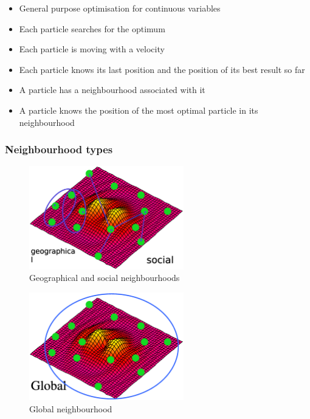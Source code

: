 \documentclass[a4paper]{article}
\begin{document}
\begin{itemize}
  \item General purpose optimisation for continuous variables
  \item Each particle searches for the optimum
  \item Each particle is moving with a velocity
  \item Each particle knows its last position and the position of its best
        result so far
  \item A particle has a neighbourhood associated with it
  \item A particle knows the position of the most optimal particle in its
        neighbourhood
\end{itemize}

\subsubsection{Neighbourhood types}

\begin{figure}[h!]
  \centering
  \includegraphics[width=0.6\textwidth]{graphics/pso_neighbourhoods_1.eps}
  \caption{Geographical and social neighbourhoods}
  \label{fig:pso_neighbourhoods_1}
\end{figure}
\FloatBarrier

\begin{figure}[h!]
  \centering
  \includegraphics[width=0.6\textwidth]{graphics/pso_neighbourhoods_2.eps}
  \caption{Global neighbourhood}
  \label{fig:pso_neighbourhoods_2}
\end{figure}
\FloatBarrier
\end{document}

